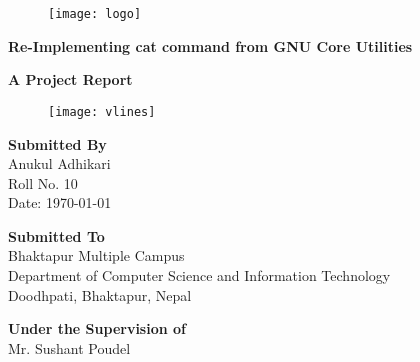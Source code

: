 \pagestyle{empty}
\begin{figure}[tp] %
\centering
\texttt{[image: logo]}
\end{figure}
\begin{center}
 {\Large \textbf{{Re-Implementing cat command from GNU Core Utilities}}}\par
 {\large \textbf{{A Project Report}\\}}
\begin{figure}[hbtp]
 \centering
 \texttt{[image: vlines]}
\end{figure}
  {\Large \textbf{{Submitted By}\\}}
  {\Large Anukul Adhikari\\\large Roll No. 10\\ \large Date: {\today}}\par        
{\Large \textbf{{Submitted To}\\}}
{\large Bhaktapur Multiple Campus \\ Department of Computer Science and Information Technology\\
					Doodhpati, Bhaktapur, Nepal }\par					
{\Large\vspace*{5mm} \textbf {Under the Supervision of}\\
			\vspace*{3mm}\large Mr. Sushant Poudel}\par 
\end{center}